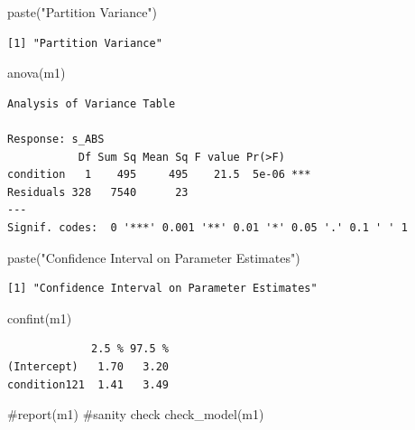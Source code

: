 \documentclass[
  letterpaper,
  DIV=11,
  numbers=noendperiod]{scrreprt}
\newenvironment{Shaded}{\begin{snugshade}}{\end{snugshade}}
\newcommand{\CommentTok}[1]{\textcolor[rgb]{0.37,0.37,0.37}{#1}}
\newcommand{\FunctionTok}[1]{\textcolor[rgb]{0.28,0.35,0.67}{#1}}
\newcommand{\NormalTok}[1]{\textcolor[rgb]{0.00,0.23,0.31}{#1}}
\newcommand{\StringTok}[1]{\textcolor[rgb]{0.13,0.47,0.30}{#1}}
\begin{document}
\begin{Shaded}
\begin{Highlighting}[]
\FunctionTok{paste}\NormalTok{(}\StringTok{"Partition Variance"}\NormalTok{)}
\end{Highlighting}
\end{Shaded}

\begin{verbatim}
[1] "Partition Variance"
\end{verbatim}

\begin{Shaded}
\begin{Highlighting}[]
\FunctionTok{anova}\NormalTok{(m1)}
\end{Highlighting}
\end{Shaded}

\begin{verbatim}
Analysis of Variance Table

Response: s_ABS
           Df Sum Sq Mean Sq F value Pr(>F)    
condition   1    495     495    21.5  5e-06 ***
Residuals 328   7540      23                   
---
Signif. codes:  0 '***' 0.001 '**' 0.01 '*' 0.05 '.' 0.1 ' ' 1
\end{verbatim}

\begin{Shaded}
\begin{Highlighting}[]
\FunctionTok{paste}\NormalTok{(}\StringTok{"Confidence Interval on Parameter Estimates"}\NormalTok{)}
\end{Highlighting}
\end{Shaded}

\begin{verbatim}
[1] "Confidence Interval on Parameter Estimates"
\end{verbatim}

\begin{Shaded}
\begin{Highlighting}[]
\FunctionTok{confint}\NormalTok{(m1)}
\end{Highlighting}
\end{Shaded}

\begin{verbatim}
             2.5 % 97.5 %
(Intercept)   1.70   3.20
condition121  1.41   3.49
\end{verbatim}

\begin{Shaded}
\begin{Highlighting}[]
\CommentTok{\#report(m1) \#sanity check}
\FunctionTok{check\_model}\NormalTok{(m1)}
\end{Highlighting}
\end{Shaded}
\end{document}

